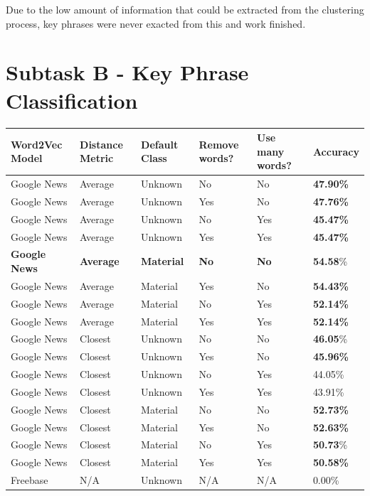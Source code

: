 Due to the low amount of information that could be extracted from the clustering process, key phrases were never exacted from this and work finished.

\section{Subtask B - Key Phrase Classification}

\begin{table}
	\centering
	\begin{tabular}{ C{2.5cm} | C{2cm} | C{2cm} | C{2cm} | C{2cm} | C{2cm} }
		\textbf{Word2Vec Model} & \textbf{Distance Metric} & \textbf{Default Class} & \textbf{Remove words?} & \textbf{Use many words?} & \textbf{Accuracy} \\
		\hline
		Google News & Average & Unknown & No & No & \textbf{47.90\%} \\
		Google News & Average & Unknown & Yes & No & \textbf{47.76\%} \\
		Google News & Average & Unknown & No & Yes & \textbf{45.47\%} \\
		Google News & Average & Unknown & Yes & Yes & \textbf{45.47\%} \\
		\textbf{Google News} & \textbf{Average} & \textbf{Material} & \textbf{No} & \textbf{No} & \textbf{54.58}\% \\
		Google News & Average & Material & Yes & No & \textbf{54.43\%} \\
		Google News & Average & Material & No & Yes & \textbf{52.14\%} \\
		Google News & Average & Material & Yes & Yes  & \textbf{52.14\%} \\
		Google News & Closest & Unknown & No & No & \textbf{46.05}\% \\
		Google News & Closest & Unknown & Yes & No & \textbf{45.96\%} \\
		Google News & Closest & Unknown & No & Yes & 44.05\% \\
		Google News & Closest & Unknown & Yes & Yes & 43.91\% \\
		Google News & Closest & Material & No & No & \textbf{52.73\%} \\
		Google News & Closest & Material & Yes & No & \textbf{52.63\%} \\
		Google News & Closest & Material & No & Yes & \textbf{50.73}\% \\
		Google News & Closest & Material & Yes & Yes & \textbf{50.58\%} \\
		Freebase & N/A & Unknown & N/A & N/A & 0.00\% \\

\end{tabular}
\end{table}
